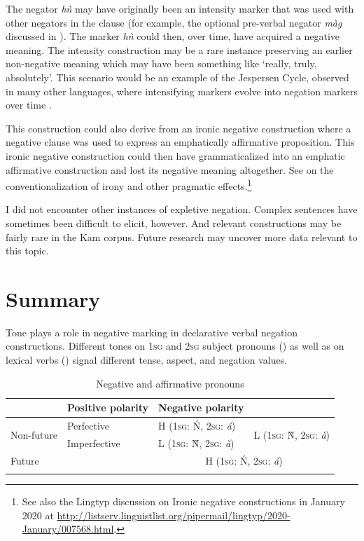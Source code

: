 \documentclass[output=paper,colorlinks,citecolor=brown]{langscibook}
\begin{document}
The negator \textit{hǹ} may have originally been an intensity marker that was used with other negators in the clause (for example, the optional pre-verbal negator \textit{màg} discussed in ). The marker \textit{hǹ} could then, over time, have acquired a negative meaning. The intensity construction may be a rare instance preserving an earlier non-negative meaning which may have been something like ‘really, truly, absolutely’. This scenario would be an example of the Jespersen Cycle, observed in many other languages, where intensifying markers evolve into negation markers over time \citep[e.g.][]{Jespersen1917,Dahl1979,Auwera2009}.

This construction could also derive from an ironic negative construction where a negative clause was used to express an emphatically affirmative proposition. This ironic negative construction could then have grammaticalized into an emphatic affirmative construction and lost its negative meaning altogether. See \citet{Shmelev2016} on the conventionalization of irony and other pragmatic effects.\footnote{See also the Lingtyp discussion on Ironic negative constructions in January 2020 at \url{http://listserv.linguistlist.org/pipermail/lingtyp/2020-January/007568.html}.}


I did not encounter other instances of expletive negation. Complex sentences have sometimes been difficult to elicit, however. And relevant constructions may be fairly rare in the Kam corpus. Future research may uncover more data relevant to this topic.

\section{Summary}\label{sec:kam:5}
 \largerpage[-1]
Tone plays a role in negative marking in declarative verbal negation constructions. Different tones on 1\textsc{sg} and 2\textsc{sg} subject pronouns () as well as on lexical verbs () signal different tense, aspect, and negation values.

\begin{table}
\small
    \begin{tabularx}{\textwidth}{llXX}
    \lspbottomrule
        \multicolumn{2}{l}{{Tense/aspect value}} & {Positive polarity} & {Negative polarity}\\
        \midrule
        \multirow{2}{*}{Non-future} & Perfective & H (\textsc{1sg}: \'{N}, \textsc{2sg}: \textit{á}) & \multirow{2}{*}{L (\textsc{1sg}: \`{N}, \textsc{2sg}: \textit{à})}\\
        & {Imperfective} & L (\textsc{1sg}: \`{N}, \textsc{2sg}: \textit{à}) & \\
        \midrule
        \multicolumn{2}{l}{Future} & \multicolumn{2}{c}{H (\textsc{1sg}: \'{N}, \textsc{2sg}: \textit{á})}\\
        \lspbottomrule
    \end{tabularx}
    \caption{Negative and affirmative pronouns}
    \label{tab:kam:2}
\end{table}
\end{document}
